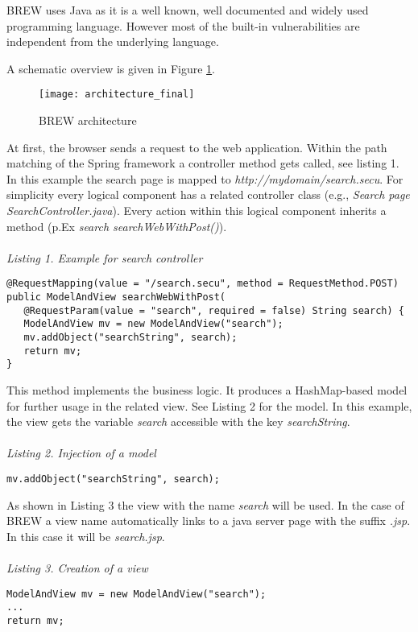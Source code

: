 \documentclass{llncs}
\begin{document}
BREW uses Java as it is a well known, well documented and widely used programming language.
However most of the built-in vulnerabilities are independent from the underlying language.

A schematic overview is given in Figure \ref{fig:architecture}.

\begin{figure}
\centering
\texttt{[image: architecture\_final]}
\caption{BREW architecture} 
\label{fig:architecture}
\end{figure}

At first, the browser sends a request to the web application. Within the path matching of the Spring framework a controller method gets called, see listing 1. In this example the search page is mapped to {\em http://mydomain/search.secu}. For simplicity every logical component has a related controller class (e.g., {\em Search page  SearchController.java}). Every action within this logical component inherits a method (p.Ex {\em search  searchWebWithPost()}).
\\\\
\noindent
{\it Listing 1. Example for search controller }
\begin{small}
\begin{verbatim}
@RequestMapping(value = "/search.secu", method = RequestMethod.POST)
public ModelAndView searchWebWithPost(
   @RequestParam(value = "search", required = false) String search) {
   ModelAndView mv = new ModelAndView("search");
   mv.addObject("searchString", search);
   return mv;
}
\end{verbatim}
\end{small}


This method implements the business logic. It produces a HashMap-based model for further usage in the related view. See Listing 2 for the model. In this example, the view gets the variable {\em search} accessible with the key {\em searchString}.
\\\\
\noindent
{\it Listing 2. Injection of a model}
\begin{small}
\begin{verbatim}
mv.addObject("searchString", search);
\end{verbatim}
\end{small}

As shown in Listing 3 the view with the name {\em search} will be used.
In the case of BREW a view name automatically links to a java server page with the suffix {\em .jsp}. In this case it will be {\em search.jsp}.
\\\\
\noindent
{\it Listing 3. Creation of a view}
\begin{small}
\begin{verbatim}
ModelAndView mv = new ModelAndView("search");
...
return mv; 
\end{verbatim}
\end{small}
\end{document}
